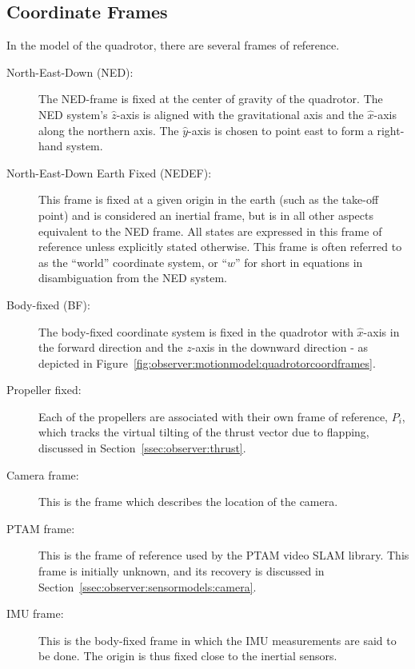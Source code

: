     \subsection{Coordinate Frames}
        In the model of the quadrotor, there are several frames of reference.
        \begin{description}
            \item[North-East-Down (NED):]
            The NED-frame is fixed at the center of gravity of the quadrotor.
            The NED system's $\hat{z}$-axis is aligned with the gravitational axis and
            the $\hat{x}$-axis along the northern axis.
            The $\hat{y}$-axis is chosen to point east to form a right-hand system.

            \item[North-East-Down Earth Fixed (NEDEF):] This frame is fixed at
            a given origin in the earth (such as the take-off point) and is
            considered an inertial frame, but is in all
            other aspects equivalent to the NED frame.
            All states are expressed in this frame of reference unless explicitly stated otherwise.
            This frame is often referred to as the ``world'' coordinate system,
            or ``$w$'' for short in equations in disambiguation from the NED system.

            \item[Body-fixed (BF):] The body-fixed coordinate system is fixed in the
            quadrotor with $\hat{x}$-axis in the forward direction and the $z$-axis in the downward
            direction - as depicted in Figure~\ref{fig:observer:motionmodel:quadrotorcoordframes}.

            \item[Propeller fixed:] Each of the propellers are associated
            with their own frame of reference, $P_{i}$, which tracks the
            virtual tilting of the thrust vector due to flapping,
            discussed in Section~\ref{ssec:observer:thrust}.

            \item[Camera frame:] This is the frame which describes the
            location of the camera.

            \item[PTAM frame:] This is the frame of reference used by the PTAM video SLAM library.
            This frame is initially unknown, and its recovery is discussed in Section~\ref{ssec:observer:sensormodels:camera}.

            \item[IMU frame:] This is the body-fixed frame in which the IMU measurements are said
            to be done. The origin is thus fixed close to the inertial sensors.
        \end{description}

